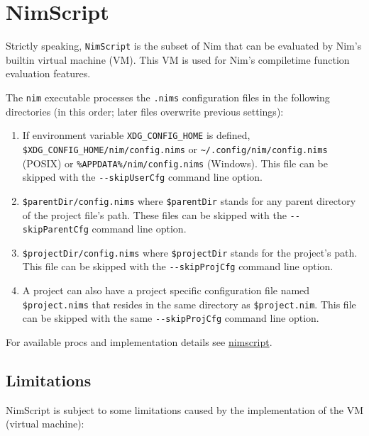 \hypertarget{nimscript}{%
\section{NimScript}\label{nimscript}}

Strictly speaking, \texttt{NimScript} is the subset of Nim that can be
evaluated by Nim's builtin virtual machine (VM). This VM is used for
Nim's compiletime function evaluation features.

The \texttt{nim} executable processes the \texttt{.nims} configuration
files in the following directories (in this order; later files overwrite
previous settings):

\begin{enumerate}
\def\labelenumi{\arabic{enumi})}
\tightlist
\item
  If environment variable \texttt{XDG\_CONFIG\_HOME} is defined,
  \texttt{\$XDG\_CONFIG\_HOME/nim/config.nims} or
  \texttt{\textasciitilde{}/.config/nim/config.nims} (POSIX) or
  \texttt{\%APPDATA\%/nim/config.nims} (Windows). This file can be
  skipped with the \texttt{-\/-skipUserCfg} command line option.
\item
  \texttt{\$parentDir/config.nims} where \texttt{\$parentDir} stands for
  any parent directory of the project file's path. These files can be
  skipped with the \texttt{-\/-skipParentCfg} command line option.
\item
  \texttt{\$projectDir/config.nims} where \texttt{\$projectDir} stands
  for the project's path. This file can be skipped with the
  \texttt{-\/-skipProjCfg} command line option.
\item
  A project can also have a project specific configuration file named
  \texttt{\$project.nims} that resides in the same directory as
  \texttt{\$project.nim}. This file can be skipped with the same
  \texttt{-\/-skipProjCfg} command line option.
\end{enumerate}

For available procs and implementation details see
\href{nimscript.html}{nimscript}.

\hypertarget{limitations}{%
\subsection{Limitations}\label{limitations}}

NimScript is subject to some limitations caused by the implementation of
the VM (virtual machine):

